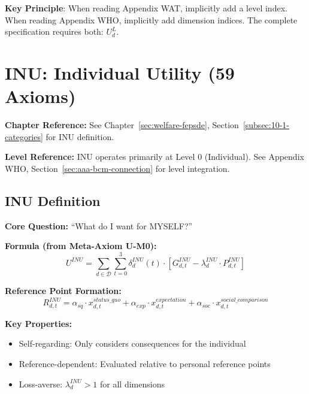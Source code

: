 \textbf{Key Principle}: When reading Appendix WAT, implicitly add a level index. 
When reading Appendix WHO, implicitly add dimension indices. The complete 
specification requires both: $U^L_d$.

\section{INU: Individual Utility (59 Axioms)}
\label{sec:app-c-inu}

\begin{cross-reference}
\textbf{Chapter Reference:} See Chapter~\ref{sec:welfare-fepsde}, 
Section~\ref{subsec:10-1-categories} for INU definition.

\textbf{Level Reference:} INU operates primarily at Level 0 (Individual). 
See Appendix WHO, Section~\ref{sec:aaa-bcm-connection} for level integration.
\end{cross-reference}

\subsection{INU Definition}

\begin{tcolorbox}[colback=blue!5!white, colframe=blue!75!black, 
    title=Individual Utility (INU)]

\textbf{Core Question:} ``What do I want for MYSELF?''

\textbf{Formula (from Meta-Axiom U-M0):}
\begin{equation}
U^{INU} = \sum_{d \in \mathcal{D}} \sum_{t=0}^{3} \delta^{INU}_{d}(t) \cdot 
\left[ G^{INU}_{d,t} - \lambda^{INU}_{d} \cdot P^{INU}_{d,t} \right]
\end{equation}

\textbf{Reference Point Formation:}
\begin{equation}
R^{INU}_{d,t} = \alpha_{sq} \cdot x^{status\_quo}_{d,t} + 
               \alpha_{exp} \cdot x^{expectation}_{d,t} + 
               \alpha_{soc} \cdot x^{social\_comparison}_{d,t}
\end{equation}

\textbf{Key Properties:}
\begin{itemize}
\item Self-regarding: Only considers consequences for the individual
\item Reference-dependent: Evaluated relative to personal reference points
\item Loss-averse: $\lambda^{INU}_d > 1$ for all dimensions
\end{itemize}

\end{tcolorbox}

